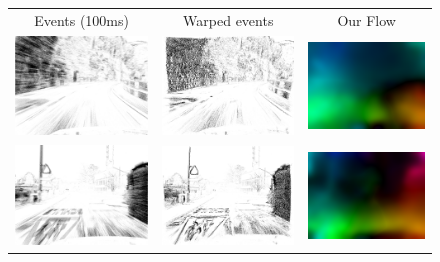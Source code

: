 \begin{figure}
  \centering
  \setlength\tabcolsep{1pt}
  \begin{tabular}{@{}ccc@{}}
    Events (100ms) & Warped events & Our Flow \\
    \includegraphics[width=0.3\linewidth]{mainmatter/figures/3_optical_flow/results_dsec/interlaken_00_b_uncomp_177.png} &
    \includegraphics[width=0.3\linewidth]{mainmatter/figures/3_optical_flow/results_dsec/interlaken_00_b_warped_177.png} &
    \includegraphics[width=0.3\linewidth]{mainmatter/figures/3_optical_flow/results_dsec/interlaken_00_b_of_177.png} \\
    \includegraphics[width=0.3\linewidth]{mainmatter/figures/3_optical_flow/results_dsec/thun_01_b_uncomp_133.png} &
    \includegraphics[width=0.3\linewidth]{mainmatter/figures/3_optical_flow/results_dsec/thun_01_b_warped_133.png} &
    \includegraphics[width=0.3\linewidth]{mainmatter/figures/3_optical_flow/results_dsec/thun_01_b_of_133.png} \\

\end{tabular}
\end{figure}
